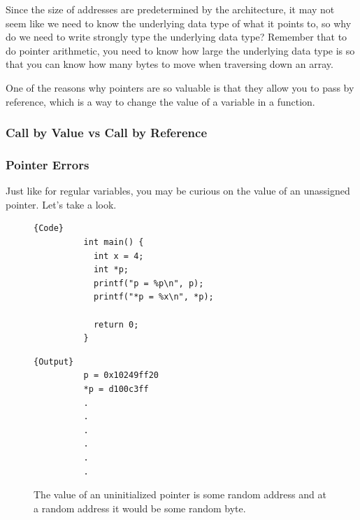 \documentclass{article}
\newcounter{definition}[section]
\newcounter{example}[section]
\begin{document}
    Since the size of addresses are predetermined by the architecture, it may not seem like we need to know the underlying data type of what it points to, so why do we need to write strongly type the underlying data type? Remember that to do pointer arithmetic, you need to know how large the underlying data type is so that you can know how many bytes to move when traversing down an array. 

    One of the reasons why pointers are so valuable is that they allow you to pass by reference, which is a way to change the value of a variable in a function. 

    \subsubsection{Call by Value vs Call by Reference}

      \begin{definition}
        \label{def:call-by-value}
        
      \end{definition}

      \begin{definition}
        \label{def:call-by-reference}
        
      \end{definition}
    
    \subsubsection{Pointer Errors}

      Just like for regular variables, you may be curious on the value of an unassigned pointer. Let's take a look. 

      \begin{example}
        \label{ex:uninitialized-pointers}
      \begin{figure}[H]
        \centering 
        \noindent\begin{minipage}{.5\textwidth}
        \begin{lstlisting}[]{Code}
          int main() { 
            int x = 4; 
            int *p; 
            printf("p = %p\n", p); 
            printf("*p = %x\n", *p); 

            return 0; 
          }
        \end{lstlisting}
        \end{minipage}
        \hfill
        \begin{minipage}{.49\textwidth}
        \begin{lstlisting}[]{Output}
          p = 0x10249ff20
          *p = d100c3ff
          .
          .
          .
          .
          .
          .
        \end{lstlisting}
        \end{minipage}
        \caption{The value of an uninitialized pointer is some random address and at a random address it would be some random byte. } 
        \label{fig:uninitialized_pointer}
      \end{figure}
      \end{example}
\end{document}
